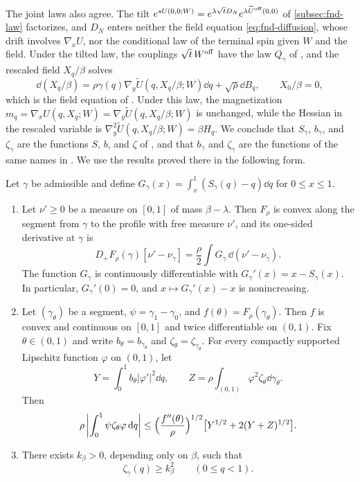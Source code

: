 The joint laws also agree. The tilt $e^{sU(0,0;W)}=e^{\lambda\sqrt t
D_N}e^{\lambda\widetilde U^{\rm off}(0,0)}$ of \cref{subsec:fnd-law}
factorizes, and $D_N$ enters neither the field equation
\eqref{eq:fnd-diffusion}, whose drift involves $\nabla_xU$, nor the
conditional law of the terminal spin given $W$ and the field. Under the tilted
law, the couplings $\sqrt t\,W^{\rm off}$ have the law $Q_\gamma$ of
\cite[Appendix~A]{AL}, and the rescaled field $X_q/\beta$ solves
\[
 \dd(X_q/\beta)=\rho\gamma(q)\nabla_y\widetilde U(q,X_q/\beta;W)\dd q
 +\sqrt\rho\dd B_q,\qquad X_0/\beta=0,
\]
which is the field equation of \cite[Section~7.1]{AL}. Under this law, the
magnetization $m_q=\nabla_xU(q,X_q;W)=\nabla_y\widetilde U(q,X_q/\beta;W)$ is
unchanged, while the Hessian in the rescaled variable is
$\nabla_y^2\widetilde U(q,X_q/\beta;W)=\beta H_q$. We conclude that $S_\gamma$,
$b_\gamma$, and $\zeta_\gamma$ are the functions $S$, $b$, and $\zeta$ of
\cite[Sections~7.1 and~7.4]{AL}, and that $b_\gamma$ and $\zeta_\gamma$ are the
functions of the same names in \cite[Appendix~A]{AL}. We use the results
proved there in the following form.

\begin{proposition}
\label{prop:loc-inputs}
Let $\gamma$ be admissible and define
$G_\gamma(x)=\int_x^1(S_\gamma(q)-q)\dd q$ for $0\le x\le1$.
\begin{enumerate}
\item[(a)] Let $\nu'\ge0$ be a measure on $[0,1]$ of mass $\beta-\lambda$.
Then $F_\rho$ is convex along the segment from $\gamma$ to the profile with
free measure $\nu'$, and its one-sided derivative at $\gamma$ is
\begin{equation}\label{eq:loc-firstvariation}
 D_+F_\rho(\gamma)[\nu'-\nu_\gamma]
 =\frac\rho2\int G_\gamma\,\dd(\nu'-\nu_\gamma).
\end{equation}
The function $G_\gamma$ is continuously differentiable with
$G_\gamma'(x)=x-S_\gamma(x)$. In particular, $G_\gamma'(0)=0$, and
$x\mapsto G_\gamma'(x)-x$ is nonincreasing.
\item[(b)] Let $(\gamma_\theta)$ be a segment, $\psi=\gamma_1-\gamma_0$, and
$f(\theta)=F_\rho(\gamma_\theta)$. Then $f$ is convex and continuous on
$[0,1]$ and twice differentiable on $(0,1)$. Fix $\theta\in(0,1)$ and write
$b_\theta=b_{\gamma_\theta}$ and $\zeta_\theta=\zeta_{\gamma_\theta}$. For every
compactly supported Lipschitz function $\varphi$ on $(0,1)$, let
\[
 Y=\int_0^1 b_\theta|\varphi'|^2\dd q,\qquad
 Z=\rho\int_{(0,1)}\varphi^2\zeta_\theta\dd\gamma_\theta .
\]
Then
\begin{equation}\label{eq:loc-response}
 \rho\left|\int_0^1\psi\zeta_\theta\varphi\,\mathrm d q\right|
 \le\Bigl(\frac{f''(\theta)}\rho\Bigr)^{1/2}
 \bigl[Y^{1/2}+2(Y+Z)^{1/2}\bigr].
\end{equation}
\item[(c)] There exists $k_\beta>0$, depending only on $\beta$, such that
\begin{equation}\label{eq:loc-in-curv}
 \zeta_\gamma(q)\ge k_\beta^2\qquad(0\le q<1).
\end{equation}
\end{enumerate}
\end{proposition}

